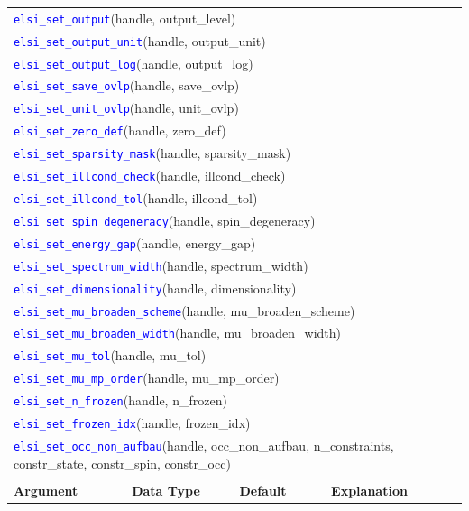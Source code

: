 \documentclass{report}
\newcommand{\api}[1]{\textcolor{blue}{\texttt{#1}}}
\begin{document}
\begin{longtable}[]{|p{30mm}|p{20mm}|p{15mm}|p{97mm}|}
\multicolumn{4}{l}{\api{elsi\_set\_output}(handle, output\_level)}\\
\multicolumn{4}{l}{\api{elsi\_set\_output\_unit}(handle, output\_unit)}\\
\multicolumn{4}{l}{\api{elsi\_set\_output\_log}(handle, output\_log)}\\
\multicolumn{4}{l}{\api{elsi\_set\_save\_ovlp}(handle, save\_ovlp)}\\
\multicolumn{4}{l}{\api{elsi\_set\_unit\_ovlp}(handle, unit\_ovlp)}\\
\multicolumn{4}{l}{\api{elsi\_set\_zero\_def}(handle, zero\_def)}\\
\multicolumn{4}{l}{\api{elsi\_set\_sparsity\_mask}(handle, sparsity\_mask)}\\
\multicolumn{4}{l}{\api{elsi\_set\_illcond\_check}(handle, illcond\_check)}\\
\multicolumn{4}{l}{\api{elsi\_set\_illcond\_tol}(handle, illcond\_tol)}\\
\multicolumn{4}{l}{\api{elsi\_set\_spin\_degeneracy}(handle, spin\_degeneracy)}\\
\multicolumn{4}{l}{\api{elsi\_set\_energy\_gap}(handle, energy\_gap)}\\
\multicolumn{4}{l}{\api{elsi\_set\_spectrum\_width}(handle, spectrum\_width)}\\
\multicolumn{4}{l}{\api{elsi\_set\_dimensionality}(handle, dimensionality)}\\
\multicolumn{4}{l}{\api{elsi\_set\_mu\_broaden\_scheme}(handle, mu\_broaden\_scheme)}\\
\multicolumn{4}{l}{\api{elsi\_set\_mu\_broaden\_width}(handle, mu\_broaden\_width)}\\
\multicolumn{4}{l}{\api{elsi\_set\_mu\_tol}(handle, mu\_tol)}\\
\multicolumn{4}{l}{\api{elsi\_set\_mu\_mp\_order}(handle, mu\_mp\_order)}\\
\multicolumn{4}{l}{\api{elsi\_set\_n\_frozen}(handle, n\_frozen)}\\
\multicolumn{4}{l}{\api{elsi\_set\_frozen\_idx}(handle, frozen\_idx)}\\
\multicolumn{4}{l}{\api{elsi\_set\_occ\_non\_aufbau}(handle, occ\_non\_aufbau, n\_constraints, constr\_state, constr\_spin, constr\_occ)}\\
\multicolumn{4}{l}{}\\
\hline
\multicolumn{1}{|l|}{\textbf{Argument}} & \multicolumn{1}{l|}{\textbf{Data Type}} & \multicolumn{1}{l|}{\textbf{Default}} & \multicolumn{1}{l|}{\textbf{Explanation}}\\

\end{longtable}
\end{document}
